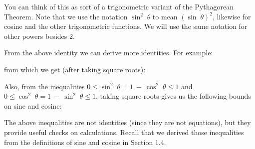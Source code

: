\begin{center}\end{center}
You can think of this as sort of a trigonometric variant of the Pythagorean Theorem.
Note that we use the notation $\sin^2 \;\theta$ to mean $(\sin\;\theta)^2$, likewise for cosine and
the other trigonometric functions. We will use the same notation for other powers besides $2$.

From the above identity we can derive more identities. For example:

\begin{center}\end{center}
from which we get (after taking square roots):

\begin{center}\end{center}
Also, from the inequalities $0 \le \sin^2 \;\theta = 1 ~-~ \cos^2 \;\theta \le 1$ and
$0 \le \cos^2 \;\theta = 1 ~-~ \sin^2 \;\theta \le 1$, taking square roots gives us the following
bounds on sine and cosine:

\begin{center}\end{center}

The above inequalities are not identities (since they are not equations), but they provide useful
checks on calculations. Recall that we derived those inequalities from the definitions of sine and
cosine in Section 1.4.

